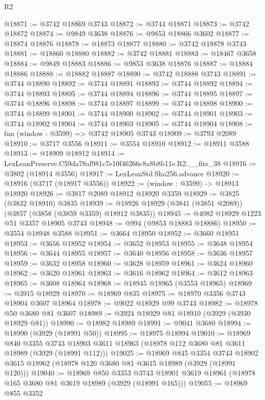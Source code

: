 \begin{lexlean}{R2}
\begin{coremodule}
@18871 := @3742 @18869 @3743
@18872 := @3744 @18871
@18873 := @3742 @18872
@18874 := @9849 @3638
@18876 := @9853 @18866 @3602
@18877 := @18874 @18876
@18878 := @18873 @18877
@18880 := @3742 @18878 @3743
@18881 := @18860 @18880
@18882 := @3742 @18881
@18883 := @18467 @3658
@18884 := @9849 @18883
@18886 := @9853 @3638 @18876
@18887 := @18884 @18886
@18888 := @18882 @18887
@18890 := @3742 @18888 @3743
@18891 := @3744 @18890
@18892 := @3744 @18891
@18893 := @3744 @18892
@18894 := @3744 @18893
@18895 := @3744 @18894
@18896 := @3744 @18895
@18897 := @3744 @18896
@18898 := @3744 @18897
@18899 := @3744 @18898
@18900 := @3744 @18899
@18901 := @3744 @18900
@18902 := @3744 @18901
@18903 := @3744 @18902
@18904 := @3744 @18903
@18905 := @3744 @18904
@18908 := fun (window : @3599) => @3742 @18905 @3743
@18909 := @3793 @2089
@18910 := @3717 @3556
@18911 := @3554 @18910
@18912 := @18911 @3588
@18913 := @18909 @18912
@18914 := LexLeanPreserve.C59da78af981c7e10f46266c8a8b8b11e.R2.__fits_38
@18916 := @3802 (@18914 @3556)
@18917 := LexLeanStd.Sha256.advance
@18920 := @18916 (@3717 (@18917 @3556))
@18922 := (window : @3599) -> @18913 @18920
@18926 := @3817 @2089 @18912 @18920 @3359
@18929 := @3825 (@3832 @18910) @3835
@18939 := @18926 @18929 (@3841 (@3851 @2089)) (@3857 (@3858 (@3859 @3359) @18912 @3835))
@18945 := @4082 @18929 @1223 @51 @3357 @18905 @3743
@18948 := @994 (@9853 @18883 @18886)
@18950 := @3554 @18948 @3588
@18951 := @3664 @18950
@18952 := @3660 @18951
@18953 := @3656 @18952
@18954 := @3652 @18953
@18955 := @3648 @18954
@18956 := @3644 @18955
@18957 := @3640 @18956
@18958 := @3636 @18957
@18959 := @3632 @18958
@18960 := @3628 @18959
@18961 := @3624 @18960
@18962 := @3620 @18961
@18963 := @3616 @18962
@18964 := @3612 @18963
@18965 := @3608 @18964
@18968 := @18945 @18965 (@3553 @18965)
@18969 := @3915 @18929
@18970 := @18969 @835
@18975 := @18970 @3356 @3743 @18904 @3607 @18964
@18978 := @9022 @18929 @99 @3743
@18982 := @18978 @50 @3680 @81 @3607
@18989 := @3924 @18929 @81 @18910 (@3929 (@3930 @18929 @81))
@18990 := @18982 @18989
@18991 := @9041 @3680
@18994 := @18990 (@3929 (@18991 @50))
@18995 := @18975 @18994
@19010 := @18969
    @840
    @3355
    @3743
    @18903
    @3611
    @18963
    (@18978 @112 @3680 @81 @3611 @18989 (@3929 (@18991 @112)))
@19025 := @18969
    @845
    @3354
    @3743
    @18902
    @3615
    @18962
    (@18978 @120 @3680 @81 @3615 @18989 (@3929 (@18991 @120)))
@19040 := @18969
    @850
    @3353
    @3743
    @18901
    @3619
    @18961
    (@18978 @165 @3680 @81 @3619 @18989 (@3929 (@18991 @165)))
@19055 := @18969
    @855
    @3352

\end{coremodule}
\end{lexlean}
